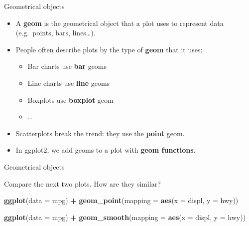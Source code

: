 \documentclass[ignorenonframetext,]{beamer}
\newenvironment{Shaded}{\begin{snugshade}}{\end{snugshade}}
\newcommand{\DataTypeTok}[1]{\textcolor[rgb]{0.13,0.29,0.53}{#1}}
\newcommand{\KeywordTok}[1]{\textcolor[rgb]{0.13,0.29,0.53}{\textbf{#1}}}
\newcommand{\NormalTok}[1]{#1}
\newcommand{\OperatorTok}[1]{\textcolor[rgb]{0.81,0.36,0.00}{\textbf{#1}}}
\newcommand{\StringTok}[1]{\textcolor[rgb]{0.31,0.60,0.02}{#1}}
\providecommand{\tightlist}{%
  \setlength{\itemsep}{0pt}\setlength{\parskip}{0pt}}
\begin{document}
\begin{frame}{Geometrical objects}
\protect\hypertarget{geometrical-objects}{}

\begin{itemize}
\item
  A \textbf{geom} is the geometrical object that a plot uses to
  represent data (e.g.~points, bars, lines\ldots{}).
\item
  People often describe plots by the type of \textbf{geom} that it uses:

  \begin{itemize}
  \tightlist
  \item
    Bar charts use \textbf{bar} geoms
  \item
    Line charts use \textbf{line} geoms
  \item
    Boxplots use \textbf{boxplot} geom
  \item
    \ldots{}
  \end{itemize}
\item
  Scatterplots break the trend: they use the \textbf{point} geom.
\item
  In ggplot2, we add geoms to a plot with \textbf{geom functions}.
\end{itemize}

\end{frame}

\begin{frame}[fragile]{Geometrical objects}
\protect\hypertarget{geometrical-objects-1}{}

Compare the next two plots. How are they similar?

\begin{Shaded}
\begin{Highlighting}[]
\KeywordTok{ggplot}\NormalTok{(}\DataTypeTok{data =}\NormalTok{ mpg) }\OperatorTok{+}\StringTok{ }
\StringTok{  }\KeywordTok{geom_point}\NormalTok{(}\DataTypeTok{mapping =} \KeywordTok{aes}\NormalTok{(}\DataTypeTok{x =}\NormalTok{ displ, }\DataTypeTok{y =}\NormalTok{ hwy))}

\KeywordTok{ggplot}\NormalTok{(}\DataTypeTok{data =}\NormalTok{ mpg) }\OperatorTok{+}\StringTok{ }
\StringTok{  }\KeywordTok{geom_smooth}\NormalTok{(}\DataTypeTok{mapping =} \KeywordTok{aes}\NormalTok{(}\DataTypeTok{x =}\NormalTok{ displ, }\DataTypeTok{y =}\NormalTok{ hwy))}
\end{Highlighting}
\end{Shaded}

\end{frame}
\end{document}
